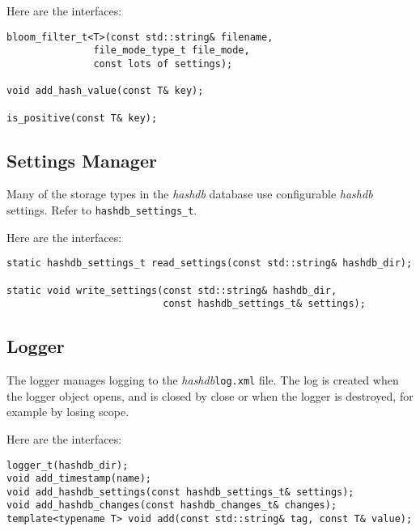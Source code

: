 \documentclass[12pt,twoside]{article}
\newcommand{\hdb}{\emph{hashdb}\xspace}
\begin{document}
Here are the interfaces:

\begin{small}
\begin{verbatim}
bloom_filter_t<T>(const std::string& filename,
               file_mode_type_t file_mode,
               const lots of settings);

void add_hash_value(const T& key);

is_positive(const T& key);
\end{verbatim}
\end{small}

\subsection{Settings Manager}
Many of the storage types in the \hdb database use configurable \hdb settings.
Refer to \texttt{hashdb\_settings\_t}.

Here are the interfaces:

\begin{small}
\begin{verbatim}
static hashdb_settings_t read_settings(const std::string& hashdb_dir);

static void write_settings(const std::string& hashdb_dir,
                           const hashdb_settings_t& settings);
\end{verbatim}
\end{small}

\subsection{Logger}
The logger manages logging to the \hdb \texttt{log.xml} file.
The log is created when the logger object opens,
and is closed by close or when the logger is destroyed,
for example by losing scope.
 
Here are the interfaces:

\begin{small}
\begin{verbatim}
logger_t(hashdb_dir);
void add_timestamp(name);
void add_hashdb_settings(const hashdb_settings_t& settings);
void add_hashdb_changes(const hashdb_changes_t& changes);
template<typename T> void add(const std::string& tag, const T& value);
\end{verbatim}
\end{small}
\end{document}
